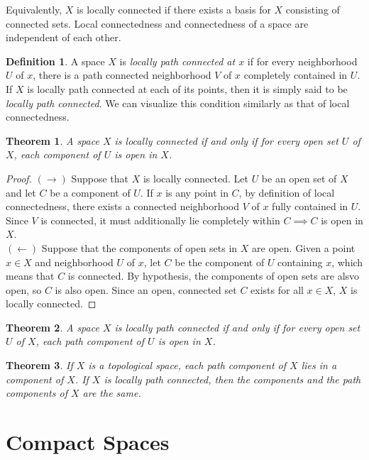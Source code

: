 \documentclass{article}
\newtheorem{theorem}{Theorem}[section]
\theoremstyle{remark}
\theoremstyle{definition}
\newtheorem{definition}{Definition}[section]
\begin{document}
Equivalently, $X$ is locally connected if there exists a basis for $X$ consisting of connected sets. Local connectedness and connectedness of a space are independent of each other. 

\begin{definition}
A space $X$ is \textit{locally path connected at $x$} if for every neighborhood $U$ of $x$, there is a path connected neighborhood $V$ of $x$ completely contained in $U$. If $X$ is locally path connected at each of its points, then it is simply said to be \textit{locally path connected}. We can visualize this condition similarly as that of local connectedness. 
\end{definition}

\begin{theorem}
A space $X$ is locally connected if and only if for every open set $U$ of $X$, each component of $U$ is open in $X$. 
\end{theorem}
\begin{proof}
$(\rightarrow)$ Suppose that $X$ is locally connected. Let $U$ be an open set of $X$ and let $C$ be a component of $U$. If $x$ is any point in $C$, by definition of local connectedness, there exists a connected neighborhood $V$ of $x$ fully contained in $U$. Since $V$ is connected, it must additionally lie completely within $C \implies C$ is open in $X$. \\
$(\leftarrow)$ Suppose that the components of open sets in $X$ are open. Given a point $x \in X$ and neighborhood $U$ of $x$, let $C$ be the component of $U$ containing $x$, which means that $C$ is connected. By hypothesis, the components of open sets are alsvo open, so $C$ is also open. Since an open, connected set $C$ exists for all $x \in X$, $X$ is locally connected. 
\end{proof}

\begin{theorem}
A space $X$ is locally path connected if and only if for every open set $U$ of $X$, each path component of $U$ is open in $X$.
\end{theorem}

\begin{theorem}
If $X$ is a topological space, each path component of $X$ lies in a component of $X$. If $X$ is locally path connected, then the components and the path components of $X$ are the same. 
\end{theorem}

\section{Compact Spaces}
\end{document}
